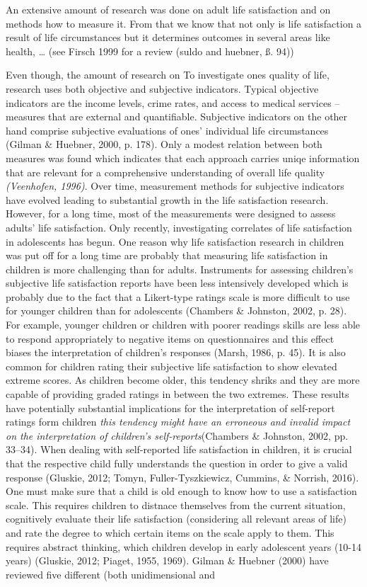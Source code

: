 \documentclass[a4, 12pt]{article}
\begin{document}
An extensive amount of research was done on adult life satisfaction and on methods how to measure it. From that we know that not only is life satisfaction a result of life circumstances but it determines outcomes in several areas like health, \ldots{} (see Firsch 1999 for a review (suldo and huebner, ß. 94))

Even though, the amount of research on
\label{measurement}
To investigate ones quality of life, research uses both objective and subjective indicators. Typical objective indicators are the income levels, crime rates, and access to medical services -- measures that are external and quantifiable. Subjective indicators on the other hand comprise subjective evaluations of ones' individual life circumstances (Gilman \& Huebner, 2000, p. 178). Only a modest relation between both measures was found which indicates that each approach carries uniqe information that are relevant for a comprehensive understanding of overall life quality \emph{(Veenhofen, 1996)}. Over time, measurement methods for subjective indicators have evolved leading to substantial growth in the life satisfaction research. However, for a long time, most of the measurements were designed to assess adults' life satisfaction. Only recently, investigating correlates of life satisfaction in adolescents has begun. One reason why life satisfaction research in children was put off for a long time are probably that measuring life satisfaction in children is more challenging than for adults. Instruments for assessing children's subjective life satisfaction reports have been less intensively developed which is probably due to the fact that a Likert-type ratings scale is more difficult to use for younger children than for adolescents (Chambers \& Johnston, 2002, p. 28). For example, younger children or children with poorer readings skills are less able to respond appropriately to negative items on questionnaires and this effect biases the interpretation of children's responses (Marsh, 1986, p. 45). It is also common for children rating their subjective life satisfaction to show elevated extreme scores. As children become older, this tendency shriks and they are more capable of providing graded ratings in between the two extremes. These results have potentially substantial implications for the interpretation of self-report ratings form children \emph{this tendency might have an erroneous and invalid impact on the interpretation of children's self-reports}(Chambers \& Johnston, 2002, pp. 33--34). When dealing with self-reported life satisfaction in children, it is crucial that the respective child fully understands the question in order to give a valid response (Gluskie, 2012; Tomyn, Fuller-Tyszkiewicz, Cummins, \& Norrish, 2016). One must make sure that a child is old enough to know how to use a satisfaction scale. This requires children to distnace themselves from the current situation, cognitively evaluate their life satisfaction (considering all relevant areas of life) and rate the degree to which certain items on the scale apply to them. This requires abstract thinking, which children develop in early adolescent years (10-14 years) (Gluskie, 2012; Piaget, 1955, 1969). Gilman \& Huebner (2000) have reviewed five different (both unidimensional and 
\end{document}
